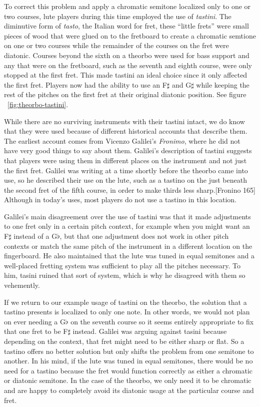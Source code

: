 To correct this problem and apply a chromatic semitone localized only to one or two
courses, lute players during this time employed the use of \textit{tastini}.  The
diminutive form of \textit{tasto}, the Italian word for fret, these ``little frets'' were
small pieces of wood that were glued on to the fretboard to create a chromatic semtione on
one or two courses while the remainder of the courses on the fret were diatonic.  Courses
beyond the sixth on a theorbo were used for bass support and any that were on the
fretboard, such as the seventh and eighth course, were only stopped at the first fret.
This made tastini an ideal choice since it only affected the first fret. Players now had
the ability to use an F$\sharp$ and G$\sharp$ while keeping the rest of the pitches on the
first fret at their original diatonic position. See figure ~\ref{fig:theorbo-tastini}.

While there are no surviving instruments with their tastini intact, we do know that they
were used because of different historical accounts that describe them.  The earliest
account comes from Vicenzo Galilei's \textit{Fronimo}, where he did not have very good
things to say about them.  Galilei's description of tastini suggests that players were
using them in different places on the instrument and not just the first fret.  Galilei was
writing at a time shortly before the theorbo came into use, so he described their use on
the lute, such as a tastino on the just beneath the second fret of the fifth course, in
order to make thirds less sharp.[Fronino 165]  Although in today's uses, most players do
not use a tastino in this location.

Galilei's main disagreement over the use of tastini was that it made adjustments to one
fret only in a certain pitch context, for example when you might want an F$\sharp$ instead
of a G$\flat$, but that one adjustment does not work in other pitch contexts or match the
same pitch of the instrument in a different location on the fingerboard.  He also
maintained that the lute was tuned in equal semitones and a well-placed fretting system
was sufficient to play all the pitches necessary. To him, tasini ruined that sort of
system, which is why he disagreed with them so vehemently.

If we return to our example usage of tastini on the theorbo, the solution that a tastino
presents is localized to only one note.  In other words, we would not plan on ever needing
a G$\flat$ on the seventh course so it seems entirely appropriate to fix that one fret to
be F$\sharp$ instead.  Galilei was arguing against tasini because depending on the
context, that fret might need to be either sharp or flat.  So a tastino offers no better
solution but only shifts the problem from one semitone to another.  In his mind, if the
lute was tuned in equal semitones, there would be no need for a tastino because the fret
would function correctly as either a chromatic or diatonic semitone.  In the case of the
theorbo, we only need it to be chromatic and are happy to completely avoid its diatonic
usage at the particular course and fret.

